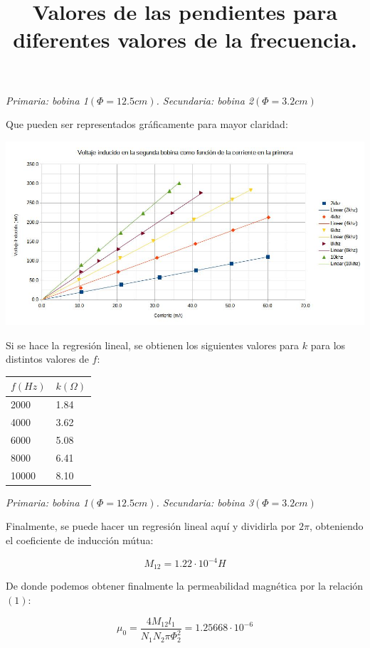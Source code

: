 \documentclass[a4paper,12pt]{article}
\begin{document}
\begin{center}
    \textit{Primaria: bobina 1$(\Phi = 12.5cm)$. Secundaria: bobina 2$(\Phi = 3.2cm)$}
\end{center}
Que pueden ser representados gráficamente para mayor claridad:

\includegraphics[width=\textwidth]{G12.jpg}

Si se hace la regresión lineal, se obtienen los siguientes valores para $k$ para los distintos valores de $f$:

\begin{table}[h!]
    \title{\textbf{Valores de las pendientes para diferentes valores de la frecuencia.}}
    \centering
    \begin{tabular}{|l|l|}
    \hline
        $f(Hz)$ & $k(\Omega)$\\\hline
        2000 & 1.84 \\ \hline
        4000 & 3.62 \\ \hline
        6000 & 5.08 \\ \hline
        8000 & 6.41 \\ \hline
        10000 & 8.10 \\ \hline
    \end{tabular}
\end{table}
\begin{center}
    \textit{Primaria: bobina 1$(\Phi = 12.5cm)$. Secundaria: bobina 3$(\Phi = 3.2cm)$}
\end{center}

Finalmente, se puede hacer un regresión lineal aquí y dividirla por $2\pi$, obteniendo el coeficiente de inducción mútua:

$$M_{12} =  1.22\cdot 10^{-4} H$$

De donde podemos obtener finalmente la permeabilidad magnética por la relación $(1)$:

$$\mu_0 = \frac{4M_{12} l_1}{N_1 N_2 \pi \Phi^2_2} = 1.25668 \cdot 10^{-6}$$
\end{document}
